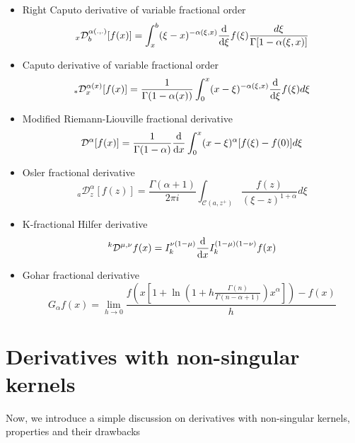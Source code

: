 \documentclass[twoside]{book}
\begin{document}
{\begin{itemize}
    \item Right Caputo derivative of variable fractional order
          \begin{equation}
              _{x}\mathcal{D}^{\alpha(.,.)}_{b}[f(x)] = \int_x^b (\xi-x)^{-\alpha(\xi,x)} \dv{}{\xi} f(\xi)\frac{d\xi}{\Gamma{[1-\alpha(\xi,x)]}}
          \end{equation}
    \item Caputo derivative of variable fractional order
          \begin{equation}
              _{*}\mathcal{D}^{\alpha(x)}_{x}[f(x)] = \frac{1}{\Gamma{(1-\alpha(x))}} \int_0^x (x-\xi)^{-\alpha(\xi,x)} \dv{}{\xi} f(\xi) d\xi
          \end{equation}
    \item Modified Riemann-Liouville fractional derivative
          \begin{equation}
              \mathcal{D}^{\alpha}[f(x)] = \frac{1}{\Gamma{(1-\alpha)}} \dv{}{x} \int_0^x (x-\xi)^{\alpha} [f(\xi)-f(0)] d\xi
          \end{equation}
    \item Osler fractional derivative
          \begin{equation}
              _{a}\mathcal{D}^{\alpha}_{z} [f(z)] = \frac{\Gamma{(\alpha+1)}}{2\pi i} \int_{\mathcal{C}(a,z^+)} \frac{f(z)}{(\xi-z)^{1+\alpha}} d\xi
          \end{equation}
    \item K-fractional Hilfer derivative
          \begin{equation}
              ^{k}\mathcal{D}^{\mu,\nu} f(x) = I^{\nu(1-\mu)}_k \dv{}{x} I^{(1-\mu)(1-\nu)}_k f(x)
          \end{equation}

    \item Gohar fractional derivative
          \begin{equation}
              G_{\alpha} f(x) = \lim_{h \to 0 } \frac{f\left( x \left[ 1+ \ln{(1+h \frac{\Gamma{(n)}}{\Gamma{(n-\alpha+1)}}) x^{\alpha}}\right]\right) - f(x)}{h}
          \end{equation}
\end{itemize}


\chapter{Derivatives with non-singular kernels}
Now, we introduce a simple discussion on derivatives with non-singular kernels, properties and their drawbacks
}
\end{document}
